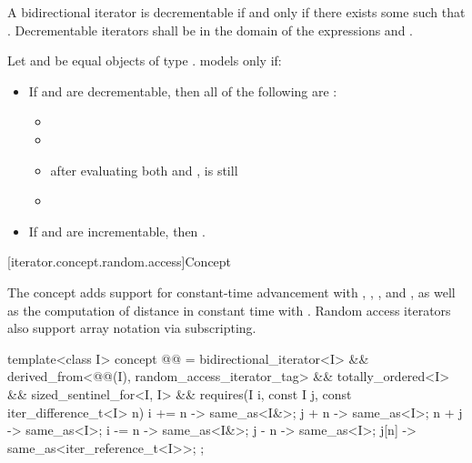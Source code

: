 \pnum
A bidirectional iterator  is decrementable if and only if there exists some  such that
. Decrementable iterators  shall be in the domain of the expressions
 and .

\pnum
Let  and  be equal objects of type .
 models  only if:
\begin{itemize}
\item If  and  are decrementable,
  then all of the following are :
  \begin{itemize}
  \item {}
  \item {}
  \item after evaluating both  and ,
     is still 
  \item {}
  \end{itemize}
  \item If  and  are incrementable, then
    .
\end{itemize}

[iterator.concept.random.access]{Concept }

\pnum
The  concept adds support for
constant-time advancement with \tcode{+=}, \tcode{+}, \tcode{-=}, and \tcode{-},
as well as the computation of distance in constant time with \tcode{-}.
Random access iterators also support array notation via subscripting.

\begin{codeblock}
template<class I>
  concept @@ =
    bidirectional_iterator<I> &&
    derived_from<@@(I), random_access_iterator_tag> &&
    totally_ordered<I> &&
    sized_sentinel_for<I, I> &&
    requires(I i, const I j, const iter_difference_t<I> n) {
      { i += n } -> same_as<I&>;
      { j +  n } -> same_as<I>;
      { n +  j } -> same_as<I>;
      { i -= n } -> same_as<I&>;
      { j -  n } -> same_as<I>;
      {  j[n]  } -> same_as<iter_reference_t<I>>;
    };
\end{codeblock}

